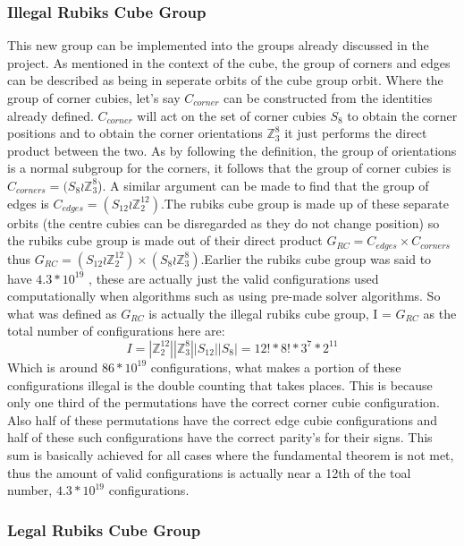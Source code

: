 \documentclass{article}
\newcounter{theo}[section]\setcounter{theo}{0}
\newcounter{lem}[section]\setcounter{lem}{0}
\begin{document}
\subsubsection{Illegal Rubiks Cube Group}
This new group can be implemented into the groups already discussed in the project. As mentioned in the context of the cube, the group of corners and edges can be described as being in seperate orbits of the cube group orbit. Where the group of corner cubies, let's say $C_{corner}$ can be constructed from the identities already defined. $C_{corner}$ will act on the set of corner cubies $S_{8}$ to obtain the corner positions and to obtain the corner orientations $\mathbb{Z}_{3}^{8}$ it just performs the direct product between the two. As by following the definition, the group of orientations is a normal subgroup for the corners, it follows that the group of corner cubies is $C_{corners} = (S_8 \wr \mathbb{Z}_{3}^{8}$). A similar argument can be made to find that the group of edges is $C_{edges} = (S_{12} \wr \mathbb{Z}_{2}^{12})$.\newline The rubiks cube group is made up of these separate orbits (the centre cubies can be disregarded as they do not change position) so the rubiks cube group is made out of their direct product $G_{RC} = C_{edges} \times C_{corners}$ thus $G_{RC} = (S_{12} \wr \mathbb{Z}_{2}^{12}) \times (S_8 \wr \mathbb{Z}_{3}^{8})$.\newline Earlier the rubiks cube group was said to have $4.3*10^{19}$ , these are actually just the valid configurations used computationally when algorithms such as using pre-made solver algorithms. So what was defined as $G_{RC}$ is actually the illegal rubiks cube group, I = $G_{RC}$ as the total number of configurations here are:
\begin{equation}\label{23}
I = |\mathbb{Z}_{2}^{12}||\mathbb{Z}_{3}^{8}||S_{12}||S_8| =  12! * 8! * 3^7 * 2^{11}
\end{equation}
Which is around $86 * 10^{19}$ configurations, what makes a portion of these configurations illegal is the double counting that takes places. This is because only one third of the permutations have the correct corner cubie configuration. Also half of these permutations have the correct edge cubie configurations and half of these such configurations have the correct parity's for their signs. This sum is basically achieved for all cases where the fundamental theorem is not met, thus the amount of valid configurations is actually near a 12th of the toal number,  $4.3*10^{19}$ configurations. 
\subsubsection{Legal Rubiks Cube Group}
\end{document}
